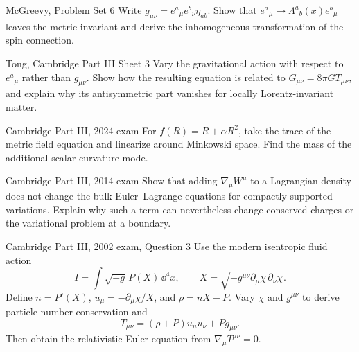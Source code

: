 \begin{exercises}
\begin{exercise}{McGreevy, Problem Set 6}
Write \(g_{\mu\nu}=e^a{}_\mu e^b{}_\nu\eta_{ab}\).  Show that
\(e^a{}_\mu\mapsto\Lambda^a{}_b(x)e^b{}_\mu\) leaves the metric invariant and
derive the inhomogeneous transformation of the spin connection.
\end{exercise}

\begin{exercise}{Tong, Cambridge Part III Sheet 3}
Vary the gravitational action with respect to \(e^a{}_\mu\) rather than
\(g_{\mu\nu}\).  Show how the resulting equation is related to
\(G_{\mu\nu}=8\pi GT_{\mu\nu}\), and explain why its antisymmetric part
vanishes for locally Lorentz-invariant matter.
\end{exercise}

\begin{exercise}{Cambridge Part III, 2024 exam}
For \(f(R)=R+\alpha R^2\), take the trace of the metric field equation and
linearize around Minkowski space.  Find the mass of the additional scalar
curvature mode.
\end{exercise}

\begin{exercise}{Cambridge Part III, 2014 exam}
Show that adding \(\nabla_\mu W^\mu\) to a Lagrangian density does not change
the bulk Euler--Lagrange equations for compactly supported variations.
Explain why such a term can nevertheless change conserved charges or the
variational problem at a boundary.
\end{exercise}

\begin{exercise}{Cambridge Part III, 2002 exam, Question 3}
Use the modern isentropic fluid action
\[
I=\int \sqrt{-g}\,P(X)\,\dd^4x,
\qquad
X=\sqrt{-g^{\mu\nu}\partial_\mu\chi\,\partial_\nu\chi}.
\]
Define \(n=P'(X)\),
\(u_\mu=-\partial_\mu\chi/X\), and
\(\rho=nX-P\).  Vary \(\chi\) and \(g^{\mu\nu}\) to derive particle-number
conservation and
\[
T_{\mu\nu}=(\rho+P)u_\mu u_\nu+Pg_{\mu\nu}.
\]
Then obtain the relativistic Euler equation from
\(\nabla_\mu T^{\mu\nu}=0\).
\end{exercise}



\end{exercises}

